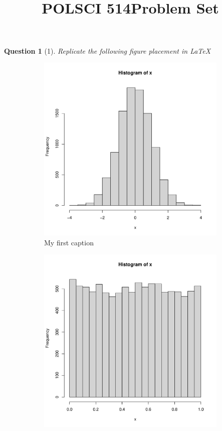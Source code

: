 \documentclass[11pt]{article}
\title{\vspace{-50pt}
\Huge \name
\\\vspace{20pt}
\huge POLSCI 514\hfill Problem Set \hw}
\author{}
\date{}
\theoremstyle{quest}
\newtheorem*{question}{Question}
\begin{document}
\maketitle

\begin{question}[1]
  Replicate the following figure placement in LaTeX 
\end{question}

\begin{figure}[h]
     \centering
     \begin{subfigure}{0.45\textwidth}
         \centering
         \includegraphics[width=\textwidth]{figs/normal.pdf}
         \caption{My first caption}
     \end{subfigure}
     \hfill
     \begin{subfigure}{0.45\textwidth}
         \centering
         \includegraphics[width=\textwidth]{figs/unif.pdf}

\end{subfigure}
\end{figure}
\end{document}
